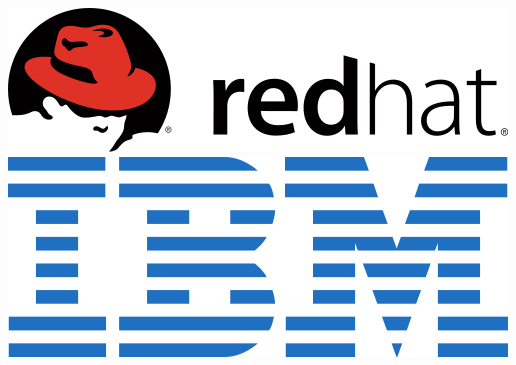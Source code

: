 \documentclass[xcolor=dvipsnames]{beamer}
\begin{document}
\begin{frame}
	\includegraphics[scale=0.20]{redhat.png}\hspace{0.8cm}
	\hspace{0.15cm}\includegraphics[scale=0.15]{ibm.png}\hspace{0.8cm}

\end{frame}
\end{document}
